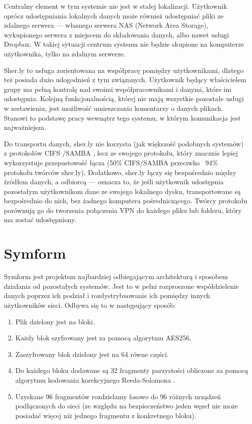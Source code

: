 Centralny element w tym systemie nie jest w stałej lokalizacji. Użytkownik oprócz udostępniania lokalnych danych może również udostępniać pliki ze zdalnego serwera --- własnego serwera NAS (Network Area Storage), wykupionego serwera z miejscem do składowania danych, albo nawet usługi Dropbox. W takiej sytuacji centrum systemu nie będzie skupione na komputerze użytkownika, tylko na zdalnym serwerze.

Sher.ly to usługa zorientowana na współpracę pomiędzy użytkownikami, dlatego też posiada dużo udogodnień z tym związanych. Użytkownik będący właścicielem grupy ma pełną kontrolę nad swoimi współpracownikami i danymi, które im udostępnia. Kolejną funkcjonalnością, której nie mają wszystkie pozostałe usługi w zestawieniu, jest możliwość umieszczania komentarzy o danych plikach. Stanowi to podstawę pracy wewnątrz tego systemu, w którym komunikacja jest najważniejsza.

Do transportu danych, sher.ly nie korzysta (jak większość podobnych systemów) z protokołów CIFS \cite{cifs}/SAMBA \cite{samba}, lecz ze swojego protokołu, który znacznie lepiej wykorzystuje przepustowość łącza (50\% CIFS/SAMBA przeciwko ~94\% protokołu twórców sher.ly). Dodatkowo, sher.ly łączy się bezpośrednio między źródłem danych, a odbiorcą --- oznacza to, że jeśli użytkownik udostępnia pozostałym użytkownikom dane ze swojego lokalnego dysku, transportowane są bezpośrednio do nich, bez żadnego komputera pośredniczącego. Twórcy protokołu porównują go do tworzenia połączenia VPN do każdego pliku lub folderu, który ma zostać udostępniony.

\section*{Symform}

Symform \cite{symform} jest projektem najbardziej odbiegającym architekturą i sposobem działania od pozostałych systemów. Jest to w pełni rozproszone współdzielenie danych poprzez ich podział i rozdystrybuowanie ich pomiędzy innych użytkowników sieci. Odbywa się to w następujący sposób:

\begin{enumerate}[noitemsep]
 \item Plik dzielony jest na bloki.
 \item Każdy blok szyfrowany jest za pomocą algorytmu AES256.
 \item Zaszyfrowany blok dzielony jest na 64 równe części.
 \item Do każdego bloku dodawane są 32 fragmenty parzystości obliczone za pomocą algorytmu kodowania korekcyjnego Reeda-Solomona \cite{rscode}.
 \item Uzyskane 96 fragmentów rozdzielamy losowo do 96 różnych urządzeń podłączonych do sieci (ze względu na bezpieczeństwo jeden węzeł nie może posiadać więcej niż jednego fragmentu z konkretnego bloku).
\end{enumerate}

